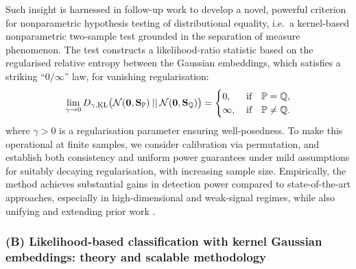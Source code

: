 \documentclass{article}
\begin{document}
Such insight is harnessed in follow-up work \cite{santoroLRT25} to develop a novel, powerful criterion for nonparametric hypothesis testing of distributional equality, i.e.\ a kernel-based nonparametric two-sample test grounded in the  separation of measure phenomenon. The test constructs a likelihood-ratio statistic based on the regularised relative entropy \cite{minh2020infinite,minh2021regularized} between the Gaussian embeddings, which  satisfies a striking “0/$\infty$” law, for vanishing regularisation:
$$
  \lim_{\gamma \to 0}  
    D_{\gamma, \mathrm{KL}} \big( \mathcal{N}(\mathbf{0}, \mathbf{S}_{\mathbb{P}}) \:||\:  \mathcal{N}(\mathbf{0}, \mathbf{S}_{\mathbb{Q}}) \big) 
  = \begin{cases}
      0, \: &\textnormal{if} \quad \mathbb{P}=\mathbb{Q},\\
      \infty, \: &\textnormal{if} \quad \mathbb{P}\neq \mathbb{Q}.
  \end{cases}
$$
where $\gamma>0$ is a regularisation parameter ensuring well-posedness.
To make this operational at finite samples, we consider calibration via permutation, and establish both consistency and uniform power guarantees under mild assumptions for suitably decaying regularisation, with increasing sample size. Empirically, the method achieves substantial gains in detection power compared to state-of-the-art approaches, especially in high-dimensional
 and weak-signal regimes, while also unifying and extending prior work \cite{eric2007testing, hagrass2024spectral}.

\medskip







\subsubsection{(B) Likelihood-based classification with kernel Gaussian embeddings: theory and scalable methodology}
\end{document}
